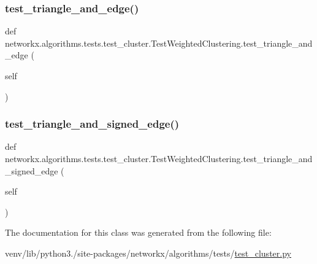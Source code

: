 \subsubsection{\texorpdfstring{test\+\_\+triangle\+\_\+and\+\_\+edge()}{test\_triangle\_and\_edge()}}
{\footnotesize\ttfamily def networkx.\+algorithms.\+tests.\+test\+\_\+cluster.\+Test\+Weighted\+Clustering.\+test\+\_\+triangle\+\_\+and\+\_\+edge (\begin{DoxyParamCaption}\item[{}]{self }\end{DoxyParamCaption})}

\mbox{\label{classnetworkx_1_1algorithms_1_1tests_1_1test__cluster_1_1TestWeightedClustering_a76f2b7ef09b995c99a5191e680b7ffb7}} 
\subsubsection{\texorpdfstring{test\+\_\+triangle\+\_\+and\+\_\+signed\+\_\+edge()}{test\_triangle\_and\_signed\_edge()}}
{\footnotesize\ttfamily def networkx.\+algorithms.\+tests.\+test\+\_\+cluster.\+Test\+Weighted\+Clustering.\+test\+\_\+triangle\+\_\+and\+\_\+signed\+\_\+edge (\begin{DoxyParamCaption}\item[{}]{self }\end{DoxyParamCaption})}



The documentation for this class was generated from the following file\+:\begin{DoxyCompactItemize}
\item 
venv/lib/python3./site-\/packages/networkx/algorithms/tests/\hyperlink{tests_2test__cluster_8py}{test\+\_\+cluster.\+py}\end{DoxyCompactItemize}
